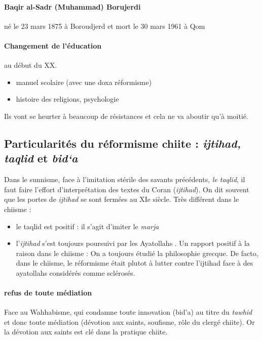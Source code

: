 \paragraph{Baqir al-Sadr (Muhammad) Borujerdi} né le 23 mars 1875 à Boroudjerd et mort le 30 mars 1961 à Qom 


\paragraph{Changement de l'éducation} au début du XX.

 \begin{itemize}
     \item  manuel scolaire (avec une doxa réformisme)
     \item histoire des religions, psychologie
 \end{itemize}
Ils vont se heurter à beaucoup de résistances et cela ne va aboutir qu'à moitié.


  
 
\subsection{Particularités du réformisme chiite : \emph{ijtihad, taqlid} et
    \emph{bid`a}}

Dans le sunnisme, face à l'imitation stérile des savants précédents, \emph{le taqlid}, il faut faire l'effort d'interprétation des textes du Coran (\emph{ijtihad}). On dit souvent que les portes de \emph{ijtihad} se sont fermées au XIe siècle.
Très différent dans le chiisme : 
\begin{itemize}
    \item le taqlid est positif : il s'agit d'imiter le \textit{marja}
    \item l'\textit{ijtihad} s'est toujours poursuivi par les Ayatollahs . Un rapport positif à la raison dans le chiisme : On a toujours étudié la philosophie grecque. De facto, dans le chiisme, le réformisme était plutot à lutter contre l'ijtihad face à des ayatollahs considérés comme sclérosés. 
\end{itemize}

\paragraph{refus de toute médiation}Face au Wahhabisme, qui condamne toute innovation (bid'a) au titre du \textit{tawhid} et donc toute médiation (dévotion aux saints, soufisme, rôle du clergé chiite). Or la dévotion aux saints est clé dans la pratique chiite.

